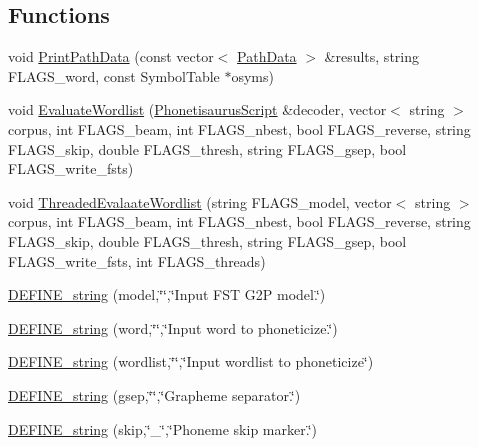 \subsection*{Functions}
\begin{DoxyCompactItemize}
\item 
void \hyperlink{phonetisaurus-g2pfst_8cc_ae165e819f68afd06f4196f641650b75d}{Print\+Path\+Data} (const vector$<$ \hyperlink{struct_path_data}{Path\+Data} $>$ \&results, string F\+L\+A\+G\+S\+\_\+word, const Symbol\+Table $\ast$osyms)
\item 
void \hyperlink{phonetisaurus-g2pfst_8cc_a4181dbd1238ca513fa8cdd93a1fcbe85}{Evaluate\+Wordlist} (\hyperlink{class_phonetisaurus_script}{Phonetisaurus\+Script} \&decoder, vector$<$ string $>$ corpus, int F\+L\+A\+G\+S\+\_\+beam, int F\+L\+A\+G\+S\+\_\+nbest, bool F\+L\+A\+G\+S\+\_\+reverse, string F\+L\+A\+G\+S\+\_\+skip, double F\+L\+A\+G\+S\+\_\+thresh, string F\+L\+A\+G\+S\+\_\+gsep, bool F\+L\+A\+G\+S\+\_\+write\+\_\+fsts)
\item 
void \hyperlink{phonetisaurus-g2pfst_8cc_a77b088fd34c5279046f26d724b014da2}{Threaded\+Evalaate\+Wordlist} (string F\+L\+A\+G\+S\+\_\+model, vector$<$ string $>$ corpus, int F\+L\+A\+G\+S\+\_\+beam, int F\+L\+A\+G\+S\+\_\+nbest, bool F\+L\+A\+G\+S\+\_\+reverse, string F\+L\+A\+G\+S\+\_\+skip, double F\+L\+A\+G\+S\+\_\+thresh, string F\+L\+A\+G\+S\+\_\+gsep, bool F\+L\+A\+G\+S\+\_\+write\+\_\+fsts, int F\+L\+A\+G\+S\+\_\+threads)
\item 
\hyperlink{phonetisaurus-g2pfst_8cc_a51f5bc48baa4e878451eef911aa7d437}{D\+E\+F\+I\+N\+E\+\_\+string} (model,\char`\"{}\char`\"{},\char`\"{}Input F\+ST G2P model.\char`\"{})
\item 
\hyperlink{phonetisaurus-g2pfst_8cc_aa17bb07281b4dc769ec6d47ae1454617}{D\+E\+F\+I\+N\+E\+\_\+string} (word,\char`\"{}\char`\"{},\char`\"{}Input word to phoneticize.\char`\"{})
\item 
\hyperlink{phonetisaurus-g2pfst_8cc_a84093c82f2c1c4653edc1aa9437b6497}{D\+E\+F\+I\+N\+E\+\_\+string} (wordlist,\char`\"{}\char`\"{},\char`\"{}Input wordlist to phoneticize\char`\"{})
\item 
\hyperlink{phonetisaurus-g2pfst_8cc_acbb7133d99f95a3d1607e7d8cf17d491}{D\+E\+F\+I\+N\+E\+\_\+string} (gsep,\char`\"{}\char`\"{},\char`\"{}Grapheme separator.\char`\"{})
\item 
\hyperlink{phonetisaurus-g2pfst_8cc_ac145945f0f742f84761694c50d60660c}{D\+E\+F\+I\+N\+E\+\_\+string} (skip,\char`\"{}\+\_\+\char`\"{},\char`\"{}Phoneme skip marker.\char`\"{})
\item 

\end{DoxyCompactItemize}
